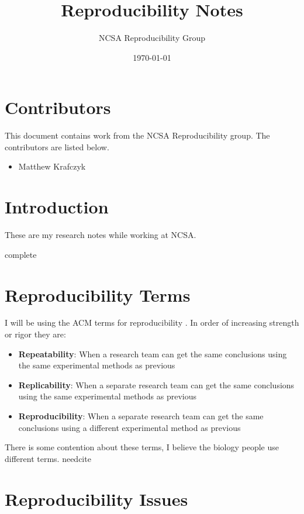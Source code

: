 \documentclass[american]{article}
\title{Reproducibility Notes}
\author{NCSA Reproducibility Group}
\date{\today}
\newcommand{\complete}{
	\gls{complete}
}
\newcommand{\needcite}{
	\gls{needcite}
}
\begin{document}
\maketitle

\tableofcontents

\section{Contributors} \label{sec:contributors}

This document contains work from the NCSA Reproducibility group. The contributors are listed below.

\begin{itemize}
\item Matthew Krafczyk
\end{itemize}

\section{Introduction} \label{sec:introduction}

These are my research notes while working at NCSA.

\complete

\section{Reproducibility Terms} \label{sec:reproducibility-terms}

I will be using the ACM terms for reproducibility \cite{acm-badging}. In order of increasing strength or rigor they are:

\begin{itemize}
\item \textbf{Repeatability}: When a research team can get the same conclusions using the same experimental methods as previous
\item \textbf{Replicability}: When a separate research team can get the same conclusions using the same experimental methods as previous
\item \textbf{Reproducibility}: When a separate research team can get the same conclusions using a different experimental method as previous
\end{itemize}

There is some contention about these terms, I believe the biology people use different terms. \needcite

\section{Reproducibility Issues} \label{sec:reproducibility-issues}
\end{document}
